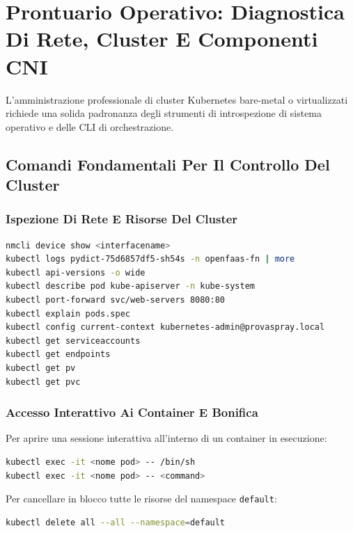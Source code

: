 \documentclass[11pt, a4paper]{article}
\begin{document}

\section{Prontuario Operativo: Diagnostica Di Rete, Cluster E Componenti CNI}

L'amministrazione professionale di cluster Kubernetes bare-metal o virtualizzati richiede una solida padronanza degli strumenti di introspezione di sistema operativo e delle CLI di orchestrazione.

\subsection{Comandi Fondamentali Per Il Controllo Del Cluster}

\subsubsection{Ispezione Di Rete E Risorse Del Cluster}
\begin{lstlisting}[language=bash]
nmcli device show <interfacename>
kubectl logs pydict-75d6857df5-sh54s -n openfaas-fn | more
kubectl api-versions -o wide
kubectl describe pod kube-apiserver -n kube-system
kubectl port-forward svc/web-servers 8080:80
kubectl explain pods.spec
kubectl config current-context kubernetes-admin@provaspray.local
kubectl get serviceaccounts
kubectl get endpoints
kubectl get pv
kubectl get pvc
\end{lstlisting}

\subsubsection{Accesso Interattivo Ai Container E Bonifica}
Per aprire una sessione interattiva all'interno di un container in esecuzione:
\begin{lstlisting}[language=bash]
kubectl exec -it <nome pod> -- /bin/sh
kubectl exec -it <nome pod> -- <command>
\end{lstlisting}
Per cancellare in blocco tutte le risorse del namespace \texttt{default}:
\begin{lstlisting}[language=bash]
kubectl delete all --all --namespace=default
\end{lstlisting}
\end{document}
